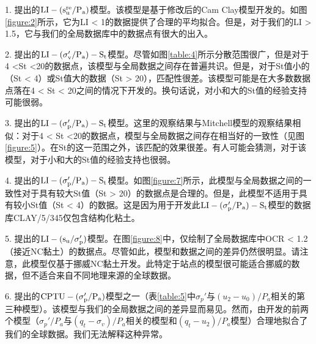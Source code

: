 \begin{Parallel}{0.60\textwidth}{}
{        1. \citet{Wroth1978137}提出的$\rm{LI}-(s_u^{re}/P_a)$模型。该模型是基于修改后的Cam Clay模型开发的。如图\ref{figure:2}所示，它为LI < 1的数据提供了合理的平均拟合。但是，对于我们的LI > 1.5，它与我们的全局数据库中的数据点有很大的出入。

        2. \citet{Mitchell1993}提出的$\rm{LI}-(\sigma_v'/P_a)-S_t$模型。尽管如图\ref{table:4}所示分散范围很广，但是对于4 <St <20的数据点，该模型与全局数据之间存在普遍共识。但是，对于St值小的（St < 4）或St值大的数据（St > 20），匹配性很差。该模型可能是在大多数数据点落在4 < St < 20之间的情况下开发的。换句话说，对小和大的St值的经验支持可能很弱。

        3. \citet{NAVFAC1982}提出的$\rm{LI}-(\sigma_p'/P_a)-S_t$模型。这里的观察结果与Mitchell模型的观察结果相似：对于4 < St <20的数据点，模型与全局数据之间存在相当好的一致性（见图\ref{figure:5}）。在St的这一范围之外，该匹配的效果很差。有人可能会猜测，对于该模型，对于小和大的St值的经验支持也很弱。

        4. \citet{Ching2012522}提出的$\rm{LI}-(\sigma_p'/P_a)-S_t$模型。如图\ref{figure:7}所示，此模型与全局数据之间的一致性对于具有较大St值（St > 20）的数据点是合理的。但是，此模型不适用于具有较小St值（St < 4）的数据。这是因为用于开发此$\rm{LI}-(\sigma_p'/P_a)-S_t$模型的数据库CLAY/5/345仅包含结构化粘土。
        
        5. \citet{Bjerrum1960711}提出的$\rm{LI}-(s_u/\sigma_p')$模型。在图\ref{figure:8}中，仅绘制了全局数据库中OCR < 1.2（接近NC黏土）的数据点。尽管如此，模型和数据之间的差异仍然很明显。请注意，此模型仅基于挪威NC黏土开发。此特定于站点的模型很可能适合挪威的数据，但不适合来自不同地理来源的全球数据。
        
        6. \citet{Chen1996488}提出的$\rm{CPTU}-(\sigma_p'/P_a)$模型之一（表\ref{table:5}中$\sigma_p'$与$(u_2-u_0)/P_a$相关的第三种模型）。该模型与我们的全局数据之间的差异显而易见。然而，由\citet{Chen1996488}开发的前两个模型（$\sigma_p'/P_a$与$(q_t-\sigma_v)/P_a$相关的模型和$(q_t-u_2)/P_a$模型）合理地拟合了我们的全球数据。我们无法解释这种异常。
    }
    \ParallelPar
\end{Parallel}